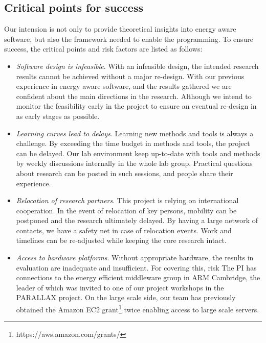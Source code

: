 \documentclass{article}
\begin{document}
\subsection{Critical points for success}
Our intension is not only to provide theoretical insights into energy aware software, but also the framework needed to enable the programming.
To ensure success, the critical points and risk factors are listed as follows:
\begin{itemize}
  \item \textit{Software design is infeasible}. With an infeasible design, the intended research results cannot be achieved without a major re-design.
  With our previous experience in energy aware software, and the results gathered we are confident about the main directions in the research. Although we intend to monitor the feasibility early in the project to ensure an eventual re-design in as early stages as possible.\vspace{-0.2cm}
  \item \textit{Learning curves lead to delays}. Learning new methods and tools is always a challenge. By exceeding the time budget in methods and tools, the project can be delayed.
  Our lab environment keep up-to-date with tools and methods by weekly discussions internally in the whole lab group. Practical questions about research can be posted in such sessions, and people share their experience.
  \vspace{-0.2cm}
 \item \textit{Relocation of research partners}. This project is relying on international cooperation. In the event of relocation of key persons, mobility can be postponed and the research ultimately delayed.
 By having a large network of contacts, we have a safety net in case of relocation events. Work and timelines can be re-adjusted while keeping the core research intact.\vspace{-0.2cm}
 \item \textit{Access to hardware platforms}. Without appropriate hardware, the results in evaluation are inadequate and insufficient.
 For covering this, risk The PI has connections to the energy efficient middleware group in ARM Cambridge, the leader of which was invited to one of our project workshops in the PARALLAX project.
 On the large scale side, our team has previously obtained the Amazon EC2 grant\footnote{https://aws.amazon.com/grants/} twice enabling access to large scale servers.
\end{itemize}
\end{document}
